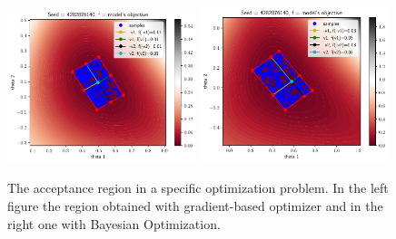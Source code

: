 \documentclass[article, shortnames]{jss}
\begin{document}
\begin{figure}[ht]
    \begin{center}
        \includegraphics[width=0.49\textwidth]{./latex_files/images/chapter4/ma2_region_1.pdf}
        \includegraphics[width=0.49\textwidth]{./latex_files/images/chapter4/ma2_region_1_bo.pdf}
    \end{center}
  \caption[The acceptance region of a specific deterministic simulator.]{The acceptance region in a specific optimization problem. In the left figure the region obtained with gradient-based optimizer and in the right one with Bayesian Optimization.}
  \label{fig:ma2_5}
\end{figure}
\end{document}
